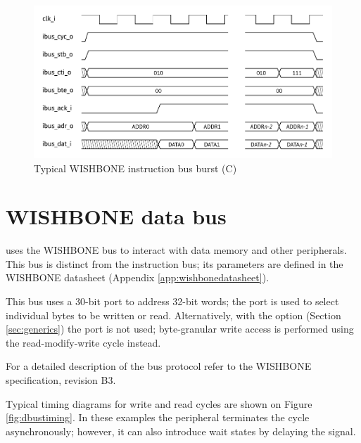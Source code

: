 \documentclass[a4paper,12pt,twoside,extrafontsizes]{memoir}
\begin{document}
\begin{figure}[htbp]
	\centering
	\includegraphics[scale=0.786]{images/ibustiming.pdf}
	\caption{Typical WISHBONE instruction bus burst (\lxp{}C)}
	\label{fig:ibustiming}
\end{figure}

\section{WISHBONE data bus}

\lxp{} uses the WISHBONE bus to interact with data memory and other peripherals. This bus is distinct from the instruction bus; its parameters are defined in the WISHBONE datasheet (Appendix \ref{app:wishbonedatasheet}).

This bus uses a 30-bit  port to address 32-bit words; the  port is used to select individual bytes to be written or read. Alternatively, with the  option (Section \ref{sec:generics}) the  port is not used; byte-granular write access is performed using the read-modify-write cycle instead.

For a detailed description of the bus protocol refer to the WISHBONE specification, revision B3.

Typical timing diagrams for write and read cycles are shown on Figure \ref{fig:dbustiming}. In these examples the peripheral terminates the cycle asynchronously; however, it can also introduce wait states by delaying the  signal.
\end{document}
